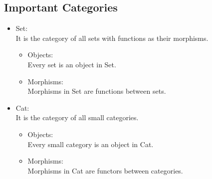 \subsection{Important Categories}

\begin{itemize}
  \item Set:\\
    It is the category of all sets with functions as their morphisms.
    \parencite{awodey:category_theory}
    \begin{itemize}
      \item Objects:\\
            Every set is an object in Set.
      \item Morphisms:\\
            Morphisms in Set are functions between sets.
    \end{itemize}

  \item Cat:\\
    It is the category of all small categories.
    \parencite{adamek_herrlich_strecker:joy_cats}
    \begin{itemize}
      \item Objects:\\
            Every small category is an object in Cat.
      \item Morphisms:\\
            Morphisms in Cat are functors between categories.
    \end{itemize}
\end{itemize}